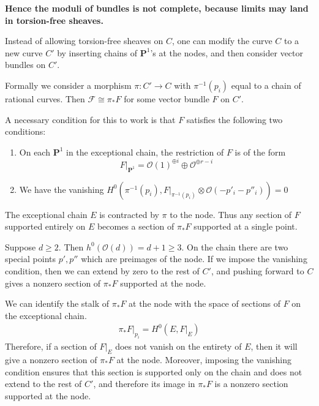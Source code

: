 \documentclass[12pt]{article}
\begin{document}
\textbf{Hence the moduli of bundles is not complete, because limits may land in torsion-free sheaves.}

Instead of allowing torsion-free sheaves on $C$, one can modify the curve $C$ to a new curve $C'$ by inserting chains of $\mathbf{P}^1$'s at the nodes, and then consider vector bundles on $C'$.


Formally we consider a morphism
$\pi:C'\to C$ with $\pi^{-1}(p_i)$ equal to a chain of rational curves. Then $\mathcal{F} \cong \pi_*F$ for some vector bundle $F$ on $C'$.

A necessary condition for this to work is that $F$ satisfies the following two conditions: 

\begin{enumerate}
    \item
On each $\mathbf{P}^1$ in the exceptional chain, the restriction of $F$ is of the form
\[F|_{\mathbf{P}^1}
=
\mathcal{O}(1)^{\oplus i}
\oplus
\mathcal{O}^{\oplus r-i}
\]

\item We have the vanishing
$H^0\!\left(\pi^{-1}(p_i),
F|_{\pi^{-1}(p_i)}\otimes
\mathcal{O}(-p'_i-p''_i)
\right)=0$
\end{enumerate}

The exceptional chain $E$ is contracted by $\pi$ to the node. Thus any section of $F$ supported entirely on $E$ becomes a section of $\pi_*F$ supported at a single point. 

Suppose $d\ge2$. Then $h^0(\mathcal O(d))=d+1\ge3$. On the chain there are two special points $p',p''$ which are preimages of the node. If we impose the vanishing condition, then we can extend by zero to the rest of $C'$, and pushing forward to $C$ gives a nonzero section of $\pi_*F$ supported at the node. 

We can identify the stalk of $\pi_*F$ at the node with the space of sections of $F$ on the exceptional chain. \begin{align*}
\pi_*F|_{p_i} = H^0(E, F|_E)
\end{align*} Therefore, if a section of $F|_E$ does not vanish on the entirety of $E$, then it will give a nonzero section of $\pi_*F$ at the node. Moreover, imposing the vanishing condition ensures that this section is supported only on the chain and does not extend to the rest of $C'$, and therefore its image in $\pi_*F$ is a nonzero section supported at the node.
\end{document}
